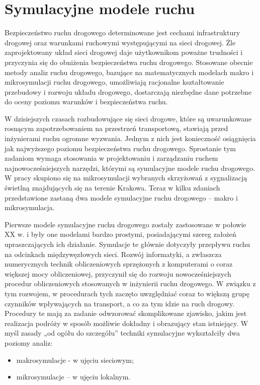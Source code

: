 \documentclass{sprawozdanie-agh}
\begin{document}
		\section{Symulacyjne modele ruchu}

		Bezpieczeństwo ruchu drogowego determinowane jest cechami infrastruktury drogowej oraz warunkami ruchowymi występującymi na sieci drogowej. Źle zaprojektowany układ sieci drogowej daje użytkownikom poważne trudności i przyczynia się do obniżenia bezpieczeństwa ruchu drogowego. Stosowane obecnie metody analiz ruchu drogowego, bazujące na matematycznych modelach makro i mikrosymulacji ruchu drogowego, umożliwiają racjonalne kształtowanie przebudowy i rozwoju układu drogowego, dostarczają niezbędne dane potrzebne do oceny poziomu warunków i bezpieczeństwa ruchu.

		W dzisiejszych czasach rozbudowujące się sieci drogowe, które są uwarunkowane rosnącym zapotrzebowaniem na przestrzeń transportową, stawiają przed inżynierami ruchu ogromne wyzwania. Jednym z nich jest konieczność osiągnięcia jak najwyższego poziomu bezpieczeństwa ruchu drogowego. Sprostanie tym zadaniom wymaga stosowania w projektowaniu i zarządzaniu ruchem najnowocześniejszych narzędzi, którymi są symulacyjne modele ruchu drogowego.
		W pracy skupiono się na mikrosymulacji wybranych skrzyżowań z sygnalizacją świetlną znajdujących się na terenie Krakowa. Teraz w kilku zdaniach przedstawione zastaną dwa modele symulacyjne ruchu drogowego – makro i mikrosymulacja.

		Pierwsze modele symulacyjne ruchu drogowego zostały zastosowane w połowie XX w. i były one modelami bardzo prostymi, posiadającymi szereg założeń upraszczających ich działanie. Symulacje te głównie dotyczyły przepływu ruchu na odcinkach międzywęzłowych sieci. Rozwój informatyki, a zwłaszcza numerycznych technik obliczeniowych sprzężonych z komputerami o coraz większej mocy obliczeniowej, przyczynił się do rozwoju nowocześniejszych procedur obliczeniowych stosowanych w inżynierii ruchu drogowego. W związku z tym rozwojem, w procedurach tych zaczęto uwzględniać coraz to większą grupę czynników wpływających na transport, a co za tym idzie na ruch drogowy. Procedury te mają za zadanie odwzorować skomplikowane zjawisko, jakim jest realizacja podróży w sposób możliwie dokładny i obrazujący stan istniejący. W myśl zasady „od ogółu do szczegółu” techniki symulacyjne wykształciły dwa poziomy analiz:

		\begin{itemize}
			\item makrosymulacje - w ujęciu sieciowym;
			\item mikrosymulacje – w ujęciu lokalnym.
		\end{itemize}
\end{document}
